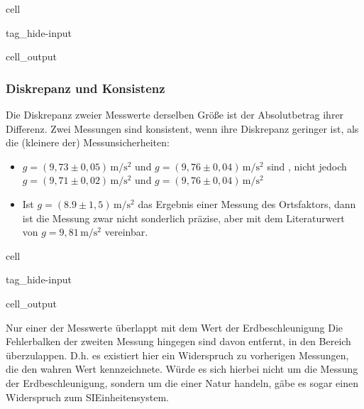 \documentclass[letterpaper,10pt,english]{jupyterBook}
\begin{document}
\begin{sphinxuseclass}{cell}
\begin{sphinxuseclass}{tag_hide-input}\begin{sphinxVerbatimOutput}

\begin{sphinxuseclass}{cell_output}
\noindent{}

\end{sphinxuseclass}\end{sphinxVerbatimOutput}

\end{sphinxuseclass}
\end{sphinxuseclass}

\subsubsection{Diskrepanz und Konsistenz}
\label{\detokenize{content/1_Messunsicherheiten:diskrepanz-und-konsistenz}}
\sphinxAtStartPar
Die Diskrepanz zweier Messwerte derselben Größe ist der Absolutbetrag ihrer Differenz. Zwei Messungen sind konsistent, wenn ihre Diskrepanz geringer ist, als die (kleinere der) Messunsicherheiten:
\begin{itemize}
\item {} 
\sphinxAtStartPar
\(g = (9,73 \pm 0,05)\,\mathrm{m/s^2}\) und \(g = (9,76 \pm 0,04)\,\mathrm{m/s^2}\) sind , nicht jedoch \(g = (9,71 \pm 0,02)\,\mathrm{m/s^2}\) und \(g = (9,76 \pm 0,04)\,\mathrm{m/s^2}\)

\item {} 
\sphinxAtStartPar
Ist \(g = (8.9 \pm 1,5)\,\mathrm{m/s^2}\) das Ergebnis einer Messung des Ortsfaktors, dann ist die Messung zwar nicht sonderlich präzise, aber mit dem Literaturwert von \(g = 9,81\,\mathrm{m/s^2}\) vereinbar.

\end{itemize}

\begin{sphinxuseclass}{cell}
\begin{sphinxuseclass}{tag_hide-input}\begin{sphinxVerbatimOutput}

\begin{sphinxuseclass}{cell_output}
\noindent{}

\end{sphinxuseclass}\end{sphinxVerbatimOutput}

\end{sphinxuseclass}
\end{sphinxuseclass}
\sphinxAtStartPar
Nur einer der Messwerte überlappt mit dem  Wert der Erdbeschleunigung Die Fehlerbalken der zweiten Messung hingegen sind davon entfernt, in den  Bereich überzulappen. D.h. es existiert hier ein Widerspruch zu vorherigen Messungen, die den wahren Wert kennzeichnete. Würde es sich hierbei nicht um die Messung der Erdbeschleunigung, sondern um die einer Natur handeln, gäbe es sogar einen Widerspruch zum SI\sphinxhyphen{}Einheitensystem.
\end{document}
